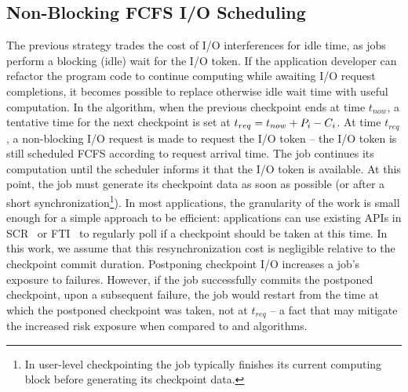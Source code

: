 
\subsection{Non-Blocking \fifononblock FCFS I/O Scheduling}
\label{sec:fcfsnonblock}

The previous strategy trades the cost of I/O interferences for
idle time, as jobs perform a blocking (idle) wait for the I/O token.
If the application developer can refactor the program code to continue
computing while awaiting I/O request completions, it becomes possible
to replace otherwise idle wait time with useful computation. In the
\fifononblock algorithm, when the previous checkpoint ends at time
$t_{now}$, a tentative time for the next checkpoint is set at
$t_{req}=t_{now}+P_{i}-C_{i}$.  At time $t_{req}$, a
non-blocking I/O request is made to request the I/O token -- the I/O
token is still scheduled FCFS according to request arrival time.  The
job continues its computation until the scheduler informs it that the
I/O token is available. At this point, the job must generate its
checkpoint data as soon as possible (or after a short
synchronization\footnote{In user-level checkpointing the job typically
  finishes its current computing block before generating its
  checkpoint data.}).  In most applications, the granularity of the
work is small enough for a simple approach to be efficient:
applications can use existing APIs in SCR~\cite{Moody10SCR} or
FTI~\cite{Bautista-Gomez11_FTI} to regularly poll if a checkpoint
should be taken at this time. In this work, we assume that this
resynchronization cost is negligible relative to the checkpoint commit
duration.
%
%
Postponing checkpoint I/O increases a job's exposure to failures.  However,
if the job successfully commits the postponed checkpoint, upon a subsequent failure,
the job would restart from the time at which the postponed checkpoint was taken, not
at $t_{req}$ -- a fact that may mitigate the increased risk exposure when
compared to \fifoblock and \nocoop algorithms.


